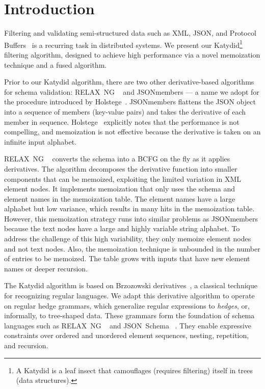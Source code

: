 \documentclass[runningheads]{llncs}
\newcommand{\RelaxNG}{%
  RELAX~NG\xspace%
}
\newcommand{\JSONSchema}{%
  JSON~Schema\xspace%
}
\newcommand{\BCFG}{\ac{BCFG}\xspace}
\newcommand{\JSON}{\ac{JSON}\xspace}
\newcommand{\XML}{\ac{XML}\xspace}
\begin{document}
\section{Introduction}

Filtering and validating semi-structured data such as \XML, \JSON, and Protocol Buffers~\cite{protobuf} is a recurring task in distributed systems.
We present our Katydid\footnote{A Katydid is a leaf insect that camouflages (requires filtering) itself in trees (data structures).} filtering algorithm, designed to achieve high performance via a novel memoization technique and a fused algorithm.

Prior to our Katydid algorithm, there are two other derivative-based algorithms for schema validation: \RelaxNG~\cite{relaxng2001simple} and JSONmembers — a name we adopt for the procedure introduced by Holstege~\cite{holstege2019application}.
JSONmembers flattens the \JSON object into a sequence of members (key-value pairs) and takes the derivative of each member in sequence.
Holstege~\cite{holstege2019application} explicitly notes that the performance is not compelling, and memoization is not effective because the derivative is taken on an infinite input alphabet.

\RelaxNG~\cite{relaxng2001simple} converts the schema into a \BCFG on the fly as it applies derivatives.
The algorithm decomposes the derivative function into smaller components that can be memoized, exploiting the limited variation in \XML element nodes.
It implements memoization that only uses the schema and element names in the memoization table.
The element names have a large alphabet but low variance, which results in many hits in the memoization table.
However, this memoization strategy runs into similar problems as JSONmembers because the text nodes have a large and highly variable string alphabet.
To address the challenge of this high variability, they only memoize element nodes and not text nodes.
Also, the memoization technique is unbounded in the number of entries to be memoized.
The table grows with inputs that have new element names or deeper recursion.

The Katydid algorithm is based on Brzozowski derivatives~\cite{brzozowski1964derivatives}, a classical technique for recognizing regular languages.
We adapt this derivative algorithm to operate on regular hedge grammars, which generalize regular expressions to \emph{hedges}, or, informally, to tree-shaped data. 
These grammars form the foundation of schema languages such as \RelaxNG~\cite{hosoya2010foundations} and \JSONSchema~\cite{jsonschemafoundations}.
They enable expressive constraints over ordered and unordered element sequences, nesting, repetition, and recursion.
\end{document}
